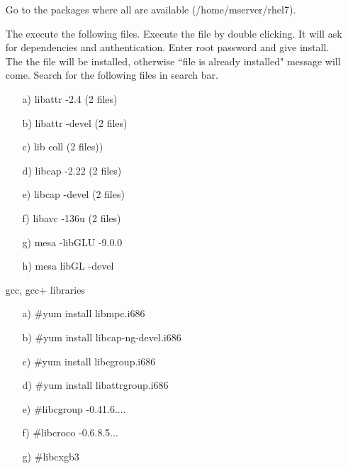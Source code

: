 \begin{enumerate}
	\item [\textbullet] Go to the packages where all are available (/home/mserver/rhel7).
	\item [\textbullet] The execute the following files. Execute the file by double clicking. It will ask for dependencies and authentication. Enter root password and give install. The the file will be installed, otherwise ``file is already installed" message will come. Search for the following files in search bar.
	\begin{enumerate}
		\item [a)] libattr -2.4 (2 files)
		\item [b)] libattr -devel (2 files)
		\item [c)] lib coll (2 files))
		\item [d)] libcap -2.22 (2 files)
		\item [e)] libcap -devel (2 files)
		\item [f)] libavc -136u (2 files)
		\item [g)] mesa -libGLU -9.0.0
		\item [h)] mesa libGL -devel
	\end{enumerate}
	\item [\textbullet] gcc, gcc+ libraries
		\begin{enumerate}
			\item [a)] $\#$yum install libmpc.i686
			\item [b)] $\#$yum install libcap-ng-devel.i686
			\item [c)] $\#$yum install libcgroup.i686
			\item [d)] $\#$yum install libattrgroup.i686
			\item [e)] $\#$libcgroup -0.41.6....
			\item [f)] $\#$libcroco -0.6.8.5...
			\item [g)] $\#$libcxgb3 
		\end{enumerate}
\end{enumerate}	


